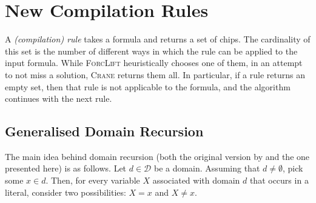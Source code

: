 \documentclass[letterpaper]{article} %
\theoremstyle{definition}
\theoremstyle{remark}
\begin{document}
\section{New Compilation Rules}\label{sec:rules}

A \emph{(compilation) rule} takes a formula and returns a set of chips. The
cardinality of this set is the number of different ways in which the rule can be
applied to the input formula. While \textsc{ForcLift}
\citep{DBLP:conf/ijcai/BroeckTMDR11} heuristically chooses one of them, in an
attempt to not miss a solution, \textsc{Crane} returns them all. In particular,
if a rule returns an empty set, then that rule is not applicable to the formula,
and the algorithm continues with the next rule.

\subsection{Generalised Domain Recursion}\label{sec:dr}

The main idea behind domain recursion (both the original version by
\citet{DBLP:conf/nips/Broeck11} and the one presented here) is as follows. Let
$d \in \mathcal{D}$ be a domain. Assuming that $d \ne \emptyset$, pick some
$x \in d$. Then, for every variable $X$ associated with domain $d$ that occurs
in a literal, consider two possibilities: $X = x$ and $X \ne x$.
\end{document}
